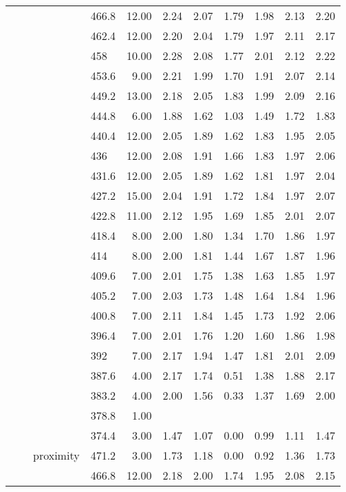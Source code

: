 \begin{longtable}{llllrrrrrrr}
   &  &  & 466.8 & 12.00 & 2.24 & 2.07 & 1.79 & 1.98 & 2.13 & 2.20 \\ 
   &  &  & 462.4 & 12.00 & 2.20 & 2.04 & 1.79 & 1.97 & 2.11 & 2.17 \\ 
   &  &  & 458 & 10.00 & 2.28 & 2.08 & 1.77 & 2.01 & 2.12 & 2.22 \\ 
   &  &  & 453.6 & 9.00 & 2.21 & 1.99 & 1.70 & 1.91 & 2.07 & 2.14 \\ 
   &  &  & 449.2 & 13.00 & 2.18 & 2.05 & 1.83 & 1.99 & 2.09 & 2.16 \\ 
   &  &  & 444.8 & 6.00 & 1.88 & 1.62 & 1.03 & 1.49 & 1.72 & 1.83 \\ 
   &  &  & 440.4 & 12.00 & 2.05 & 1.89 & 1.62 & 1.83 & 1.95 & 2.05 \\ 
   &  &  & 436 & 12.00 & 2.08 & 1.91 & 1.66 & 1.83 & 1.97 & 2.06 \\ 
   &  &  & 431.6 & 12.00 & 2.05 & 1.89 & 1.62 & 1.81 & 1.97 & 2.04 \\ 
   &  &  & 427.2 & 15.00 & 2.04 & 1.91 & 1.72 & 1.84 & 1.97 & 2.07 \\ 
   &  &  & 422.8 & 11.00 & 2.12 & 1.95 & 1.69 & 1.85 & 2.01 & 2.07 \\ 
   &  &  & 418.4 & 8.00 & 2.00 & 1.80 & 1.34 & 1.70 & 1.86 & 1.97 \\ 
   &  &  & 414 & 8.00 & 2.00 & 1.81 & 1.44 & 1.67 & 1.87 & 1.96 \\ 
   &  &  & 409.6 & 7.00 & 2.01 & 1.75 & 1.38 & 1.63 & 1.85 & 1.97 \\ 
   &  &  & 405.2 & 7.00 & 2.03 & 1.73 & 1.48 & 1.64 & 1.84 & 1.96 \\ 
   &  &  & 400.8 & 7.00 & 2.11 & 1.84 & 1.45 & 1.73 & 1.92 & 2.06 \\ 
   &  &  & 396.4 & 7.00 & 2.01 & 1.76 & 1.20 & 1.60 & 1.86 & 1.98 \\ 
   &  &  & 392 & 7.00 & 2.17 & 1.94 & 1.47 & 1.81 & 2.01 & 2.09 \\ 
   &  &  & 387.6 & 4.00 & 2.17 & 1.74 & 0.51 & 1.38 & 1.88 & 2.17 \\ 
   &  &  & 383.2 & 4.00 & 2.00 & 1.56 & 0.33 & 1.37 & 1.69 & 2.00 \\ 
   &  &  & 378.8 & 1.00 &  &  &  &  &  &  \\ 
   &  &  & 374.4 & 3.00 & 1.47 & 1.07 & 0.00 & 0.99 & 1.11 & 1.47 \\ 
   &  & proximity & 471.2 & 3.00 & 1.73 & 1.18 & 0.00 & 0.92 & 1.36 & 1.73 \\ 
   &  &  & 466.8 & 12.00 & 2.18 & 2.00 & 1.74 & 1.95 & 2.08 & 2.15 \\ 

\end{longtable}
